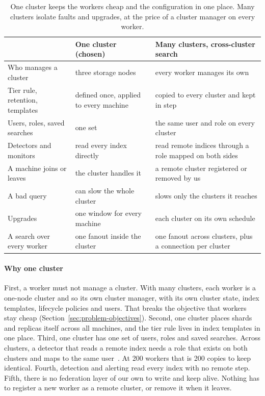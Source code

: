 \begin{table}[htbp]\caption{One cluster keeps the workers cheap and the configuration in one place. Many clusters isolate faults and upgrades, at the price of a cluster manager on every worker.}\label{tab:clusters}\centering\footnotesize
\begin{tabularx}{\textwidth}{L{3.3cm} Y Y}
\toprule
 & One cluster (chosen) & Many clusters, cross-cluster search \\
\midrule
Who manages a cluster & three storage nodes & every worker manages its own \\
Tier rule, retention, templates & defined once, applied to every machine & copied to every cluster and kept in step \\
Users, roles, saved searches & one set & the same user and role on every cluster \\
Detectors and monitors & read every index directly & read remote indices through a role mapped on both sides \\
A machine joins or leaves & the cluster handles it & a remote cluster registered or removed by us \\
A bad query & can slow the whole cluster & slows only the clusters it reaches \\
Upgrades & one window for every machine & each cluster on its own schedule \\
A search over every worker & one fanout inside the cluster & one fanout across clusters, plus a connection per cluster \\
\bottomrule
\end{tabularx}
\end{table}

\paragraph{Why one cluster}
First, a worker must not manage a cluster. With many clusters, each worker is a one-node cluster and so its own cluster manager, with its own cluster state, index templates, lifecycle policies and users. That breaks the objective that workers stay cheap (Section~\ref{sec:problem-objectives}). Second, one cluster places shards and replicas itself across all machines, and the tier rule lives in index templates in one place. Third, one cluster has one set of users, roles and saved searches. Across clusters, a detector that reads a remote index needs a role that exists on both clusters and maps to the same user~\cite{ref:adsecurity}. At 200 workers that is 200 copies to keep identical. Fourth, detection and alerting read every index with no remote step. Fifth, there is no federation layer of our own to write and keep alive. Nothing has to register a new worker as a remote cluster, or remove it when it leaves.

